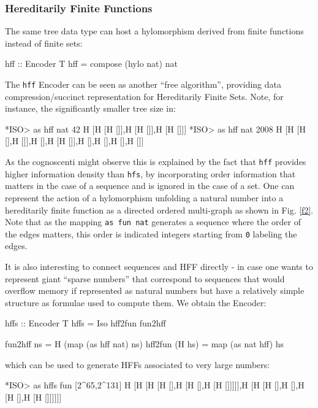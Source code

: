 \documentclass[]{INCLUDES/llncs}
\begin{document}
\subsubsection{Hereditarily Finite Functions}
The same tree data type can host a hylomorphism
derived from finite functions instead of
finite sets:
\begin{code}
hff :: Encoder T
hff = compose (hylo nat) nat
\end{code}
The {\tt hff} Encoder can be seen as another ``free algorithm'', providing
data compression/succinct representation for Hereditarily 
Finite Sets. Note, for instance,
the significantly smaller tree size in:
\begin{codex}
*ISO> as hff nat 42
H [H [H []],H [H []],H [H []]]
*ISO> as hff nat 2008
H [H [H [],H []],H [],H [H []],H [],H [],H [],H []]
\end{codex}
As the cognoscenti might observe 
this is explained by the fact that
{\tt hff} provides higher information density
than {\tt hfs}, by incorporating order information
that matters in the case of a sequence and
is ignored in the case of a set.
One can represent the action of a hylomorphism unfolding a natural number into
a hereditarily finite function as a directed ordered multi-graph as shown
in Fig. \ref{f2}. Note that as the mapping {\tt as fun nat} generates
a sequence where the order of the edges matters, this order is
indicated integers starting from {\tt 0} labeling the edges.

It is also interesting to connect sequences and HFF directly - in case one
wants to represent giant ``sparse numbers'' that correspond to sequences
that would overflow memory if represented as natural numbers but have a
relatively simple structure as formulae used to compute them. We obtain the
Encoder:
\begin{code}
hffs :: Encoder T
hffs = Iso hff2fun fun2hff

fun2hff ns = H (map (as hff nat) ns)
hff2fun (H hs) = map (as nat hff) hs
\end{code}
which can be used to generate HFFs associated to very large numbers:
\begin{codex}
*ISO> as hffs fun [2^65,2^131]
H [H [H [H [],H [H [],H [H []]]]],H [H [H [],H [],H [H [],H [H []]]]]]
\end{codex}
\end{document}
